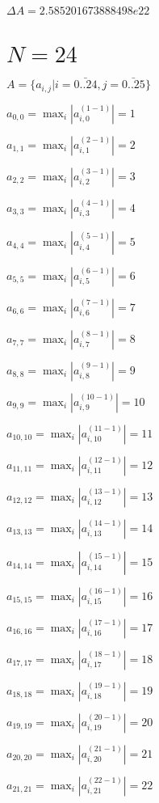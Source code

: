 \documentclass[a4paper,12pt]{article}
\begin{document}
$\Delta A = 2.585201673888498e22$



\section{ $N = 24$ }
$A = \{ a _{ i, j } | i = \bar { 0..24 }, j = \bar { 0..25 } \}$

$a _{ 0, 0 } =  \max _i |a _{ i, 0 } ^{ (1 - 1) } | = 1$

$a _{ 1, 1 } =  \max _i |a _{ i, 1 } ^{ (2 - 1) } | = 2$

$a _{ 2, 2 } =  \max _i |a _{ i, 2 } ^{ (3 - 1) } | = 3$

$a _{ 3, 3 } =  \max _i |a _{ i, 3 } ^{ (4 - 1) } | = 4$

$a _{ 4, 4 } =  \max _i |a _{ i, 4 } ^{ (5 - 1) } | = 5$

$a _{ 5, 5 } =  \max _i |a _{ i, 5 } ^{ (6 - 1) } | = 6$

$a _{ 6, 6 } =  \max _i |a _{ i, 6 } ^{ (7 - 1) } | = 7$

$a _{ 7, 7 } =  \max _i |a _{ i, 7 } ^{ (8 - 1) } | = 8$

$a _{ 8, 8 } =  \max _i |a _{ i, 8 } ^{ (9 - 1) } | = 9$

$a _{ 9, 9 } =  \max _i |a _{ i, 9 } ^{ (10 - 1) } | = 10$

$a _{ 10, 10 } =  \max _i |a _{ i, 10 } ^{ (11 - 1) } | = 11$

$a _{ 11, 11 } =  \max _i |a _{ i, 11 } ^{ (12 - 1) } | = 12$

$a _{ 12, 12 } =  \max _i |a _{ i, 12 } ^{ (13 - 1) } | = 13$

$a _{ 13, 13 } =  \max _i |a _{ i, 13 } ^{ (14 - 1) } | = 14$

$a _{ 14, 14 } =  \max _i |a _{ i, 14 } ^{ (15 - 1) } | = 15$

$a _{ 15, 15 } =  \max _i |a _{ i, 15 } ^{ (16 - 1) } | = 16$

$a _{ 16, 16 } =  \max _i |a _{ i, 16 } ^{ (17 - 1) } | = 17$

$a _{ 17, 17 } =  \max _i |a _{ i, 17 } ^{ (18 - 1) } | = 18$

$a _{ 18, 18 } =  \max _i |a _{ i, 18 } ^{ (19 - 1) } | = 19$

$a _{ 19, 19 } =  \max _i |a _{ i, 19 } ^{ (20 - 1) } | = 20$

$a _{ 20, 20 } =  \max _i |a _{ i, 20 } ^{ (21 - 1) } | = 21$

$a _{ 21, 21 } =  \max _i |a _{ i, 21 } ^{ (22 - 1) } | = 22$
\end{document}
